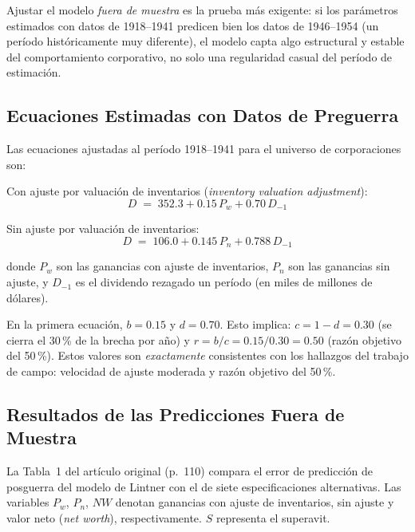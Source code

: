 \documentclass[12pt]{article}
\begin{document}
\begin{intuicion}
Ajustar el modelo \textit{fuera de muestra} es la prueba m\'as exigente: si los par\'ametros
estimados con datos de 1918--1941 predicen bien los datos de 1946--1954 (un per\'iodo
hist\'oricamente muy diferente), el modelo capta algo estructural y estable del comportamiento
corporativo, no solo una regularidad casual del per\'iodo de estimaci\'on.
\end{intuicion}

\subsection{Ecuaciones Estimadas con Datos de Preguerra}

Las ecuaciones ajustadas al per\'iodo 1918--1941 para el universo de corporaciones son:

\medskip
\noindent Con ajuste por valuaci\'on de inventarios (\textit{inventory valuation adjustment}):
\begin{equation}
  D \;=\; 352.3 + 0.15\,P_w + 0.70\,D_{-1}
\end{equation}

\noindent Sin ajuste por valuaci\'on de inventarios:
\begin{equation}
  D \;=\; 106.0 + 0.145\,P_n + 0.788\,D_{-1}
\end{equation}

donde $P_w$ son las ganancias con ajuste de inventarios, $P_n$ son las ganancias sin ajuste,
y $D_{-1}$ es el dividendo rezagado un per\'iodo (en miles de millones de d\'olares).

\begin{intuicionmat}
En la primera ecuaci\'on, $b = 0.15$ y $d = 0.70$. Esto implica:
$c = 1 - d = 0.30$ (se cierra el 30\,\% de la brecha por a\~no) y
$r = b/c = 0.15/0.30 = 0.50$ (raz\'on objetivo del 50\,\%).
Estos valores son \textit{exactamente} consistentes con los hallazgos del trabajo de campo:
velocidad de ajuste moderada y raz\'on objetivo del 50\,\%.
\end{intuicionmat}

\subsection{Resultados de las Predicciones Fuera de Muestra}

\begin{explicacion}
La Tabla~1 del art\'iculo original (p.~110) compara el error de predicci\'on de posguerra del
modelo de Lintner con el de siete especificaciones alternativas. Las variables $P_w$, $P_n$,
$NW$ denotan ganancias con ajuste de inventarios, sin ajuste y valor neto (\textit{net worth}),
respectivamente. $S$ representa el superavit.
\end{explicacion}
\end{document}
